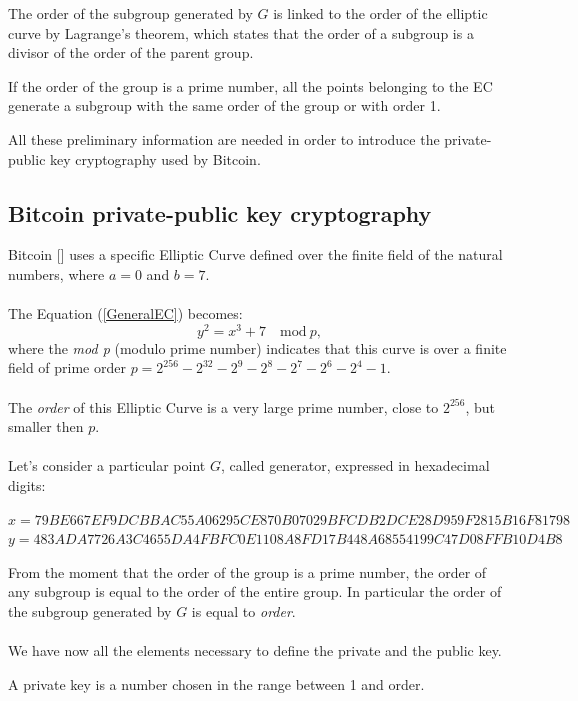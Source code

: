 \begin{remark}
	The order of the subgroup generated by $G$ is linked to the order of the elliptic curve by Lagrange's theorem, which states that the order of a subgroup is a divisor of the order of the parent group.
\end{remark}

\begin{remark}
	If the order of the group is a prime number, all the points belonging to the EC generate a subgroup with the same order of the group or with order 1.
\end{remark}
All these preliminary information are needed in order to introduce the private-public key cryptography used by Bitcoin.





\subsection{Bitcoin private-public key cryptography}

Bitcoin [\cite{11}] uses a specific Elliptic Curve defined over the finite field of the natural numbers, where $a=0$ and $b=7$.\\ \\
The Equation (\ref{GeneralEC}) becomes:
\begin{equation}\label{BitcoinEC}
y^2=x^3+7 \quad \textrm{mod} \ p,
\end{equation}
where the \textit{mod p} (modulo prime number) indicates that this curve is over a finite field of prime order $p=2^{256}-2^{32}-2^9-2^8-2^7-2^6-2^4-1$.
\\ \\
The \textit{order} of this Elliptic Curve is a very large prime number, close to $2^{256}$, but smaller then $p$. \\ \\
Let's consider a particular point $G$, called generator, expressed in hexadecimal digits:
\begin{center} 
	$ x=79BE667E F9DCBBAC 55A06295 CE870B07 029BFCDB 2DCE28D9 59F2815B 16F81798$\\
	$y=483ADA77 26A3C465 5DA4FBFC 0E1108A8 FD17B448 A6855419 9C47D08F FB10D4B8$
\end{center}
From the moment that the order of the group is a prime number, the order of any subgroup is equal to the order of the entire group. In particular the order of the subgroup generated by $G$ is equal to \textit{order}.
\\ \\
We have now all the elements necessary to define the private and the public key.
\begin{definition}
	A private key is a number chosen in the range between 1 and order.
\end{definition}

